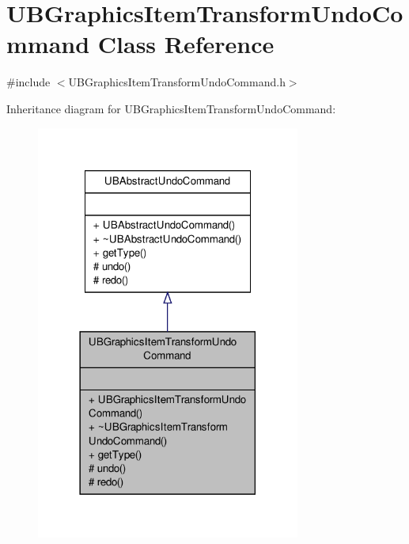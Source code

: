 \hypertarget{class_u_b_graphics_item_transform_undo_command}{\section{U\-B\-Graphics\-Item\-Transform\-Undo\-Command Class Reference}
\label{db/d7c/class_u_b_graphics_item_transform_undo_command}
}


{\ttfamily \#include $<$U\-B\-Graphics\-Item\-Transform\-Undo\-Command.\-h$>$}



Inheritance diagram for U\-B\-Graphics\-Item\-Transform\-Undo\-Command\-:
\nopagebreak
\begin{figure}[H]
\begin{center}
\leavevmode
\includegraphics[width=246pt]{d1/d55/class_u_b_graphics_item_transform_undo_command__inherit__graph}
\end{center}
\end{figure}


